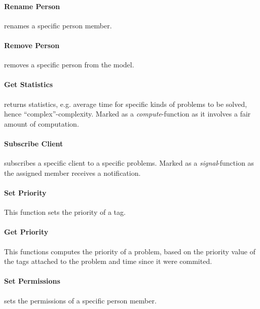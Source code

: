 \paragraph{Rename Person} renames a specific person member. 

\paragraph{Remove Person} removes a specific person from the model. 


\paragraph{Get Statistics} returns statistics, e.g. average time for specific kinds of problems to be solved, hence ``complex''-complexity. Marked as a \textit{compute}-function as it involves a fair amount of computation.

\paragraph{Subscribe Client} subscribes a specific client to a specific problems. Marked as a \textit{signal}-function as the assigned \astaff[] member receives a notification. 

\paragraph{Set Priority} This function sets the priority of a tag. 

\paragraph{Get Priority} This functions computes the priority of a problem, based on the priority value of the tags attached to the problem and time since it were commited.



\paragraph{Set Permissions} sets the permissions of a specific person member.
